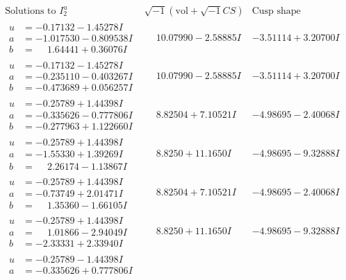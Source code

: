 \documentclass[1p]{elsarticle_modified}
\theoremstyle{definition}
\newcommand{\I}{\sqrt{-1}}
\begin{document}
$$\begin{array}{c|c|c}
\text{Solutions to }I^u_{2}& \I (\text{vol} + \sqrt{-1}CS) & \text{Cusp shape}\\
 \hline 
\begin{aligned}
u &= -0.17132 - 1.45278 I \\
a &= -1.017530 - 0.809538 I \\
b &= \phantom{-}1.64441 + 0.36076 I\end{aligned}
 & \phantom{-}10.07990 - 2.58885 I & -3.51114 + 3.20700 I \\ \hline\begin{aligned}
u &= -0.17132 - 1.45278 I \\
a &= -0.235110 - 0.403267 I \\
b &= -0.473689 + 0.056257 I\end{aligned}
 & \phantom{-}10.07990 - 2.58885 I & -3.51114 + 3.20700 I \\ \hline\begin{aligned}
u &= -0.25789 + 1.44398 I \\
a &= -0.335626 - 0.777806 I \\
b &= -0.277963 + 1.122660 I\end{aligned}
 & \phantom{-}8.82504 + 7.10521 I & -4.98695 - 2.40068 I \\ \hline\begin{aligned}
u &= -0.25789 + 1.44398 I \\
a &= -1.55330 + 1.39269 I \\
b &= \phantom{-}2.26174 - 1.13867 I\end{aligned}
 & \phantom{-}8.8250 + 11.1650 I & -4.98695 - 9.32888 I \\ \hline\begin{aligned}
u &= -0.25789 + 1.44398 I \\
a &= -0.73749 + 2.01471 I \\
b &= \phantom{-}1.35360 - 1.66105 I\end{aligned}
 & \phantom{-}8.82504 + 7.10521 I & -4.98695 - 2.40068 I \\ \hline\begin{aligned}
u &= -0.25789 + 1.44398 I \\
a &= \phantom{-}1.01866 - 2.94049 I \\
b &= -2.33331 + 2.33940 I\end{aligned}
 & \phantom{-}8.8250 + 11.1650 I & -4.98695 - 9.32888 I \\ \hline\begin{aligned}
u &= -0.25789 - 1.44398 I \\
a &= -0.335626 + 0.777806 I \\

\end{aligned}
\end{array}$$
\end{document}
